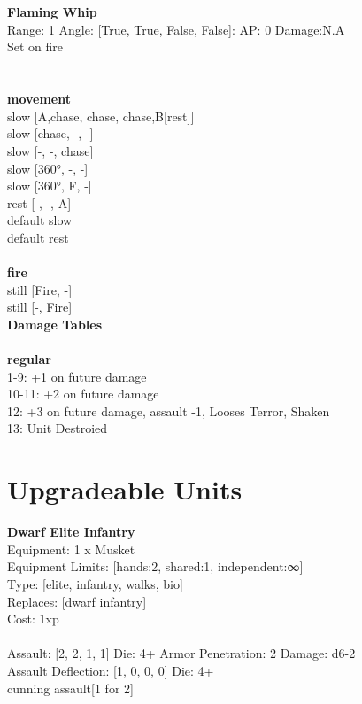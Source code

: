 \ \\

\ \\
{\bf Flaming Whip } \\



Range: 1  Angle: [True, True, False, False]: AP: 0 Damage:N.A \\
Set on fire\\ 




 
\ \\



\ \\ {\bf movement } \\
slow [A,chase, chase, chase,B[rest]] \\
slow [chase, -, -] \\
slow [-, -, chase] \\
slow [360°, -, -] \\
slow [360°, F, -] \\
rest [-, -, A] \\
default slow \\
default rest \\
\ \\ {\bf fire } \\
still [Fire, -] \\
still [-, Fire] \\


{\bf Damage Tables} \\
\ \\ {\bf regular } \\
1-9: +1 on future damage \\
10-11: +2 on future damage \\
12: +3 on future damage, assault -1, Looses Terror, Shaken \\
13: Unit Destroied \\










\pagebreak\section{Upgradeable Units}{\bf Dwarf Elite Infantry } \\
Equipment: 1 x Musket \\
Equipment Limits: [hands:2, shared:1, independent:∞] \\
Type: [elite, infantry, walks, bio] \\
Replaces: [dwarf infantry] \\
Cost: 1xp\\
\ \\
Assault: [2, 2, 1, 1] Die: 4+ Armor Penetration: 2 Damage: d6-2 \\
Assault Deflection: [1, 0, 0, 0] Die: 4+\\
\indent cunning assault[1 for 2]\\ 
 
